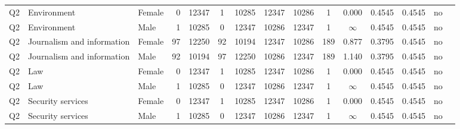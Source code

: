 \begin{longtable}{lllrcccccccccll}
Q2 & Environment & Female & 0 & 12347 & 1 & 10285 & 12347 & 10286 & 1 & 0.000 & 0.4545 & 0.4545 & no \\
Q2 & Environment & Male & 1 & 10285 & 0 & 12347 & 10286 & 12347 & 1 & $\infty$ & 0.4545 & 0.4545 & no \\
Q2 & Journalism and information & Female & 97 & 12250 & 92 & 10194 & 12347 & 10286 & 189 & 0.877 & 0.3795 & 0.4545 & no \\
Q2 & Journalism and information & Male & 92 & 10194 & 97 & 12250 & 10286 & 12347 & 189 & 1.140 & 0.3795 & 0.4545 & no \\
Q2 & Law & Female & 0 & 12347 & 1 & 10285 & 12347 & 10286 & 1 & 0.000 & 0.4545 & 0.4545 & no \\
Q2 & Law & Male & 1 & 10285 & 0 & 12347 & 10286 & 12347 & 1 & $\infty$ & 0.4545 & 0.4545 & no \\
Q2 & Security services & Female & 0 & 12347 & 1 & 10285 & 12347 & 10286 & 1 & 0.000 & 0.4545 & 0.4545 & no \\
Q2 & Security services & Male & 1 & 10285 & 0 & 12347 & 10286 & 12347 & 1 & $\infty$ & 0.4545 & 0.4545 & no \\
\end{longtable}
